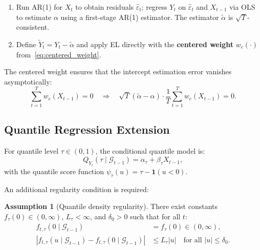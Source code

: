 \documentclass[11pt,a4paper]{article}
\theoremstyle{definition}
\newtheorem{assumption}{Assumption}[section]
\theoremstyle{remark}
\begin{document}
\begin{enumerate}[leftmargin=*, label=\textbf{Stage \arabic*:}]
    \item Run AR(1) for $X_t$ to obtain residuals $\widehat{\varepsilon}_t$;
    regress $Y_t$ on $\widehat{\varepsilon}_t$ and $X_{t-1}$ via OLS
    to estimate $\alpha$ using a first-stage AR(1) estimator.
    The estimator $\widetilde{\alpha}$ is $\sqrt{T}$-consistent.
    \item Define $\widetilde{Y}_t = Y_t - \widetilde{\alpha}$ and apply EL directly
    with the \textbf{centered weight} $w_c(\cdot)$ from~\eqref{eq:centered_weight}.
\end{enumerate}

The centered weight ensures that the intercept estimation error vanishes asymptotically:
\begin{equation}
    \sum_{t=1}^T w_c(X_{t-1}) = 0 \quad \Longrightarrow \quad
    \sqrt{T}(\widetilde{\alpha} - \alpha) \cdot \frac{1}{T}\sum_{t=1}^T w_c(X_{t-1}) = 0.
\end{equation}

\subsection{Quantile Regression Extension}

For quantile level $\tau \in (0,1)$, the conditional quantile model is:
\begin{equation}\label{eq:quantile_model}
    Q_{Y_t}(\tau \mid \mathcal{G}_{t-1}) = \alpha_\tau + \beta_\tau X_{t-1},
\end{equation}
with the quantile score function $\psi_\tau(u) = \tau - \mathbf{1}(u < 0)$.

An additional regularity condition is required:

\begin{assumption}[Quantile density regularity]\label{asm:quantile}
There exist constants $f_\tau(0) \in (0,\infty)$, $L_\tau < \infty$, and $\delta_0 > 0$
such that for all $t$:
\begin{align}
    f_{t,\tau}(0 \mid \mathcal{G}_{t-1}) &= f_\tau(0) \in (0,\infty), \\
    |f_{t,\tau}(u \mid \mathcal{G}_{t-1}) - f_{t,\tau}(0 \mid \mathcal{G}_{t-1})|
    &\leq L_\tau |u| \quad \text{for all } |u| \leq \delta_0.
\end{align}
\end{assumption}

\end{document}
